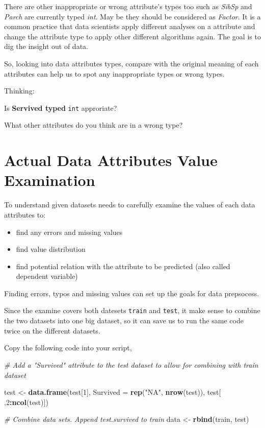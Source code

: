 \documentclass[
]{book}
\newenvironment{Shaded}{\begin{snugshade}}{\end{snugshade}}
\newcommand{\CommentTok}[1]{\textcolor[rgb]{0.56,0.35,0.01}{\textit{#1}}}
\newcommand{\DataTypeTok}[1]{\textcolor[rgb]{0.13,0.29,0.53}{#1}}
\newcommand{\DecValTok}[1]{\textcolor[rgb]{0.00,0.00,0.81}{#1}}
\newcommand{\KeywordTok}[1]{\textcolor[rgb]{0.13,0.29,0.53}{\textbf{#1}}}
\newcommand{\NormalTok}[1]{#1}
\newcommand{\OperatorTok}[1]{\textcolor[rgb]{0.81,0.36,0.00}{\textbf{#1}}}
\newcommand{\StringTok}[1]{\textcolor[rgb]{0.31,0.60,0.02}{#1}}
\providecommand{\tightlist}{%
  \setlength{\itemsep}{0pt}\setlength{\parskip}{0pt}}
\begin{document}
There are other inappropriate or wrong attribute's types too such as \emph{SibSp} and \emph{Parch} are currently typed \emph{int}. May be they should be considered as \emph{Factor}. It is a common practice that data scientists apply different analyses on a attribute and change the attribute type to apply other different algorithms again. The goal is to dig the insight out of data.

So, looking into data attributes types, compare with the original meaning of each attributes can help us to spot any inappropriate types or wrong types.

\begin{rmdthinking}
Thinking:

Is \textbf{Servived typed} \texttt{int} approriate?

What other attributes do you think are in a wrong type?
\end{rmdthinking}

\hypertarget{attvalue}{%
\section{Actual Data Attributes Value Examination}\label{attvalue}}

To understand given datasets needs to carefully examine the values of each data attributes to:

\begin{itemize}
\tightlist
\item
  find any errors and missing values
\item
  find value distribution
\item
  find potential relation with the attribute to be predicted (also called dependent variable)
\end{itemize}

Finding errors, typos and missing values can set up the goals for data prepsocess.

Since the examine covers both datesets \texttt{train} and \texttt{test}, it make sense to combine the two datasets into one big dataset, so it can save us to run the same code twice on the different datasets.

Copy the following code into your script,

\begin{Shaded}
\begin{Highlighting}[]
\CommentTok{# Add a "Survived" attribute to the test dataset to allow for combining with train dataset}

\NormalTok{test <-}\StringTok{ }\KeywordTok{data.frame}\NormalTok{(test[}\DecValTok{1}\NormalTok{], }\DataTypeTok{Survived =} \KeywordTok{rep}\NormalTok{(}\StringTok{"NA"}\NormalTok{, }\KeywordTok{nrow}\NormalTok{(test)), test[ ,}\DecValTok{2}\OperatorTok{:}\KeywordTok{ncol}\NormalTok{(test)])}

\CommentTok{# Combine data sets. Append test.survived to train}
\NormalTok{data <-}\StringTok{ }\KeywordTok{rbind}\NormalTok{(train, test)}
\end{Highlighting}
\end{Shaded}
\end{document}
